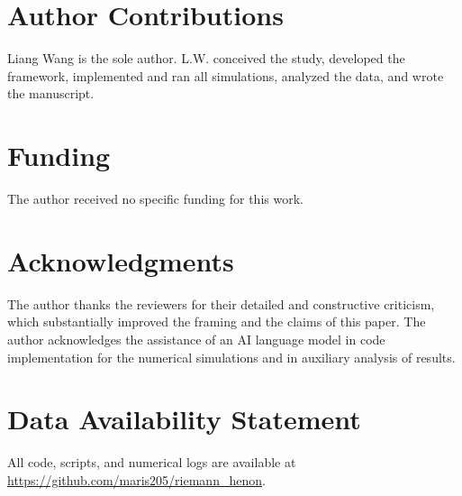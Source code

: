 \documentclass[utf8]{FrontiersinHarvard}
\begin{document}
\section*{Author Contributions}

Liang Wang is the sole author. L.W. conceived the study, developed the framework, implemented and ran all simulations, analyzed the data, and wrote the manuscript.

\section*{Funding}

The author received no specific funding for this work.

\section*{Acknowledgments}

The author thanks the reviewers for their detailed and constructive criticism, which substantially improved the framing and the claims of this paper. The author acknowledges the assistance of an AI language model in code implementation for the numerical simulations and in auxiliary analysis of results.

\section*{Data Availability Statement}

All code, scripts, and numerical logs are available at \url{https://github.com/maris205/riemann_henon}.



\end{document}
